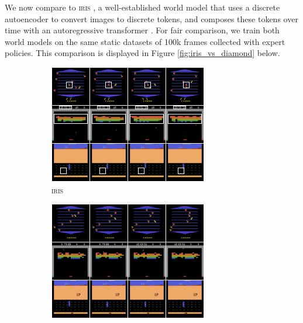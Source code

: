 We now compare to \textsc{iris} \citep{iris2023}, a well-established world model that uses a discrete autoencoder \citep{vqvae} to convert images to discrete tokens, and composes these tokens over time with an autoregressive transformer \citep{radford2019language}. For fair comparison, we train both world models on the same static datasets of 100k frames collected with expert policies. This comparison is displayed in Figure \ref{fig:iris_vs_diamond} below.

\begin{figure}[h]
  \begin{subfigure}{0.49\linewidth}
    \includegraphics[width=\linewidth]{images/figure__iris_vs_diamond__iris.png}
    \caption{\textsc{iris}} \label{fig:iris_vs_diamond__iris}
  \end{subfigure}%
  \hspace*{\fill}   %
  \begin{subfigure}{0.49\textwidth}
    \includegraphics[width=\linewidth]{images/figure__iris_vs_diamond__diamond.png}

\end{subfigure}
\end{figure}
